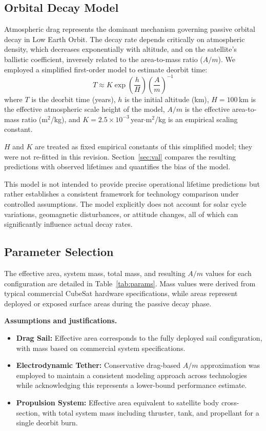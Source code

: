 \documentclass[11pt,a4paper]{article}
\begin{document}
\subsection{Orbital Decay Model}
Atmospheric drag represents the dominant mechanism governing passive orbital decay in Low Earth Orbit. The decay rate depends critically on atmospheric density, which decreases exponentially with altitude, and on the satellite's ballistic coefficient, inversely related to the area-to-mass ratio ($A/m$). We employed a simplified first-order model to estimate deorbit time:
\begin{equation}\label{eq:decay}
T \approx K \exp\!\left(\frac{h}{H}\right)\left(\frac{A}{m}\right)^{-1}
\end{equation}
where $T$ is the deorbit time (years), $h$ is the initial altitude (km), $H = 100$\,km is the effective atmospheric scale height of the model, $A/m$ is the effective area-to-mass ratio (m$^2$/kg), and $K = 2.5\times10^{-3}$\,year$\cdot$m$^2$/kg is an empirical scaling constant.

$H$ and $K$ are treated as fixed empirical constants of this simplified model; they were not re-fitted in this revision. Section~\ref{sec:val} compares the resulting predictions with observed lifetimes and quantifies the bias of the model.

This model is not intended to provide precise operational lifetime predictions but rather establishes a consistent framework for technology comparison under controlled assumptions. The model explicitly does not account for solar cycle variations, geomagnetic disturbances, or attitude changes, all of which can significantly influence actual decay rates.

\subsection{Parameter Selection}
The effective area, system mass, total mass, and resulting $A/m$ values for each configuration are detailed in Table~\ref{tab:params}. Mass values were derived from typical commercial CubeSat hardware specifications, while areas represent deployed or exposed surface areas during the passive decay phase.



\noindent\textbf{Assumptions and justifications.}
\begin{itemize}
\item \textbf{Drag Sail:} Effective area corresponds to the fully deployed sail configuration, with mass based on commercial system specifications.
\item \textbf{Electrodynamic Tether:} Conservative drag-based $A/m$ approximation was employed to maintain a consistent modeling approach across technologies while acknowledging this represents a lower-bound performance estimate.
\item \textbf{Propulsion System:} Effective area equivalent to satellite body cross-section, with total system mass including thruster, tank, and propellant for a single deorbit burn.
\end{itemize}
\end{document}
